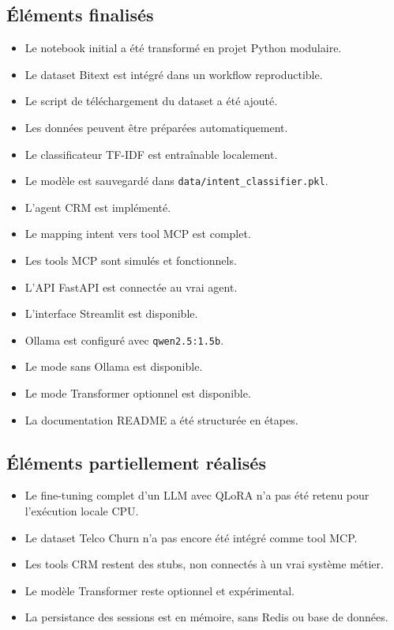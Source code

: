 \documentclass[12pt,a4paper]{report}
\begin{document}
\subsection{Éléments finalisés}

\begin{itemize}
    \item Le notebook initial a été transformé en projet Python modulaire.
    \item Le dataset Bitext est intégré dans un workflow reproductible.
    \item Le script de téléchargement du dataset a été ajouté.
    \item Les données peuvent être préparées automatiquement.
    \item Le classificateur TF-IDF est entraînable localement.
    \item Le modèle est sauvegardé dans \texttt{data/intent\_classifier.pkl}.
    \item L'agent CRM est implémenté.
    \item Le mapping intent vers tool MCP est complet.
    \item Les tools MCP sont simulés et fonctionnels.
    \item L'API FastAPI est connectée au vrai agent.
    \item L'interface Streamlit est disponible.
    \item Ollama est configuré avec \texttt{qwen2.5:1.5b}.
    \item Le mode sans Ollama est disponible.
    \item Le mode Transformer optionnel est disponible.
    \item La documentation README a été structurée en étapes.
\end{itemize}

\subsection{Éléments partiellement réalisés}

\begin{itemize}
    \item Le fine-tuning complet d'un LLM avec QLoRA n'a pas été retenu pour l'exécution locale CPU.
    \item Le dataset Telco Churn n'a pas encore été intégré comme tool MCP.
    \item Les tools CRM restent des stubs, non connectés à un vrai système métier.
    \item Le modèle Transformer reste optionnel et expérimental.
    \item La persistance des sessions est en mémoire, sans Redis ou base de données.
\end{itemize}
\end{document}
